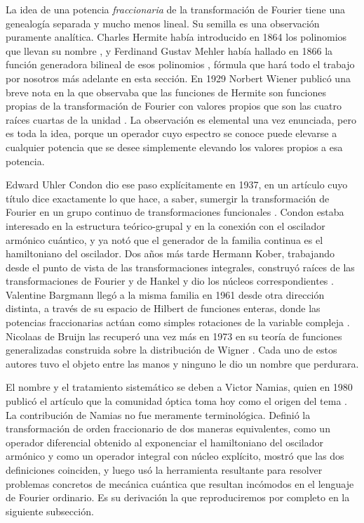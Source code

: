 		La idea de una potencia \textit{fraccionaria} de la transformación de Fourier tiene una genealogía separada y mucho menos lineal. Su semilla es una observación puramente analítica. Charles Hermite había introducido en 1864 los polinomios que llevan su nombre \citep{hermite1864nouveau}, y Ferdinand Gustav Mehler había hallado en 1866 la función generadora bilineal de esos polinomios \citep{mehler1866entwicklung}, fórmula que hará todo el trabajo por nosotros más adelante en esta sección. En 1929 Norbert Wiener publicó una breve nota en la que observaba que las funciones de Hermite son funciones propias de la transformación de Fourier con valores propios que son las cuatro raíces cuartas de la unidad \citep{wiener1929hermitian}. La observación es elemental una vez enunciada, pero es toda la idea, porque un operador cuyo espectro se conoce puede elevarse a cualquier potencia que se desee simplemente elevando los valores propios a esa potencia.

		Edward Uhler Condon dio ese paso explícitamente en 1937, en un artículo cuyo título dice exactamente lo que hace, a saber, sumergir la transformación de Fourier en un grupo continuo de transformaciones funcionales \citep{condon1937immersion}. Condon estaba interesado en la estructura teórico-grupal y en la conexión con el oscilador armónico cuántico, y ya notó que el generador de la familia continua es el hamiltoniano del oscilador. Dos años más tarde Hermann Kober, trabajando desde el punto de vista de las transformaciones integrales, construyó raíces de las transformaciones de Fourier y de Hankel y dio los núcleos correspondientes \citep{kober1939wurzeln}. Valentine Bargmann llegó a la misma familia en 1961 desde otra dirección distinta, a través de su espacio de Hilbert de funciones enteras, donde las potencias fraccionarias actúan como simples rotaciones de la variable compleja \citep{bargmann1961hilbert}. Nicolaas de Bruijn las recuperó una vez más en 1973 en su teoría de funciones generalizadas construida sobre la distribución de Wigner \citep{debruijn1973theory}. Cada uno de estos autores tuvo el objeto entre las manos y ninguno le dio un nombre que perdurara.

		El nombre y el tratamiento sistemático se deben a Victor Namias, quien en 1980 publicó el artículo que la comunidad óptica toma hoy como el origen del tema \citep{namias1980fractional}. La contribución de Namias no fue meramente terminológica. Definió la transformación de orden fraccionario de dos maneras equivalentes, como un operador diferencial obtenido al exponenciar el hamiltoniano del oscilador armónico y como un operador integral con núcleo explícito, mostró que las dos definiciones coinciden, y luego usó la herramienta resultante para resolver problemas concretos de mecánica cuántica que resultan incómodos en el lenguaje de Fourier ordinario. Es su derivación la que reproduciremos por completo en la siguiente subsección.

